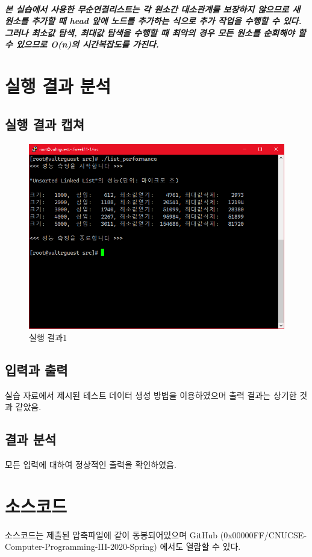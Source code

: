 \documentclass[UTF8, a4paper]{report}
\begin{document}
            \paragraph{%
                \normalfont 본 실습에서 사용한 무순연결리스트는 각 원소간 대소관계를 보장하지 않으므로 새 원소를 추가할 때 head 앞에 노드를 추가하는 식으로 추가 작업을 수행할 수 있다. 그러나 최소값 탐색, 최대값 탐색을 수행할 때 최악의 경우 모든 원소를 순회해야 할 수 있으므로 O(n)의 시간복잡도를 가진다.
            }   

    \chapter{실행 결과 분석}
        \section{실행 결과 캡쳐}
        \begin{figure}[!htb]
            \centering
            \includegraphics[width=\textwidth]{result.PNG}
            \caption{실행 결과1}
        \end{figure}
        
        \newpage

        \section{입력과 출력}
            실습 자료에서 제시된 테스트 데이터 생성 방법을 이용하였으며 출력 결과는 상기한 것과 같았음.
        \section{결과 분석}
            모든 입력에 대하여 정상적인 출력을 확인하였음.

    \chapter{소스코드}
        소스코드는 제출된 압축파일에 같이 동봉되어있으며 GitHub (0x00000FF/CNUCSE-Computer-Programming-III-2020-Spring) 에서도 열람할 수 있다.
\end{document}
